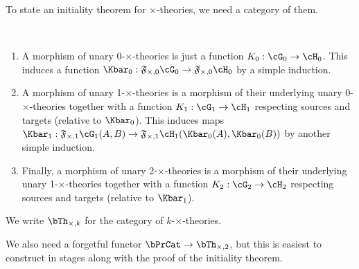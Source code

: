 To state an initiality theorem for $\times$-theories, we need a category of them.

\begin{defn}\ 
  \begin{enumerate}
  \item A morphism of unary 0-$\times$-theories is just a function $K_0:\cG_0 \to \cH_0$.
    This induces a function $\Kbar_0:\F{\times,0}\cG_0 \to \F{\times,0}\cH_0$ by a simple induction.
  \item A morphism of unary 1-$\times$-theories is a morphism of their underlying unary 0-$\times$-theories together with a function $K_1:\cG_1 \to \cH_1$ respecting sources and targets (relative to $\Kbar_0$).
    This induces maps $\Kbar_1 : \F{\times,1}\cG_1(A,B) \to \F{\times,1}\cH_1(\Kbar_0(A),\Kbar_0(B))$ by another simple induction.
  \item Finally, a morphism of unary 2-$\times$-theories is a morphism of their underlying unary 1-$\times$-theories together with a function $K_2:\cG_2 \to \cH_2$ respecting sources and targets (relative to $\Kbar_1$).
  \end{enumerate}
  We write $\timesthy k$ for the category of $k$-$\times$-theories.
\end{defn}

We also need a forgetful functor $\bPrCat \to \timesthy2$, but this is easiest to construct in stages along with the proof of the initiality theorem.

